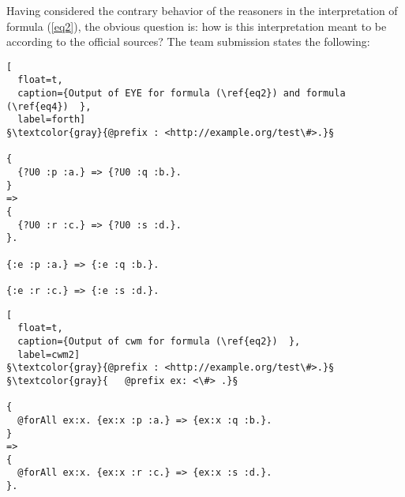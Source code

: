 Having considered the contrary behavior of the reasoners in the interpretation of formula (\ref{eq2}), the obvious question is: 
how is this interpretation meant to be according to the official sources? The team submission \cite{Notation3} states the following:
%












\begin{lstlisting}[
  float=t,
  caption={Output of EYE for formula (\ref{eq2}) and formula (\ref{eq4})  },
  label=forth]  
§\textcolor{gray}{@prefix : <http://example.org/test\#>.}§

{
  {?U0 :p :a.} => {?U0 :q :b.}.
}
=> 
{
  {?U0 :r :c.} => {?U0 :s :d.}.
}.

{:e :p :a.} => {:e :q :b.}.

{:e :r :c.} => {:e :s :d.}.

\end{lstlisting}

\begin{lstlisting}[
  float=t,
  caption={Output of cwm for formula (\ref{eq2})  },
  label=cwm2]  
§\textcolor{gray}{@prefix : <http://example.org/test\#>.}§
§\textcolor{gray}{   @prefix ex: <\#> .}§

{
  @forAll ex:x. {ex:x :p :a.} => {ex:x :q :b.}.
}     
=> 
{ 
  @forAll ex:x. {ex:x :r :c.} => {ex:x :s :d.}.
}.
\end{lstlisting}



